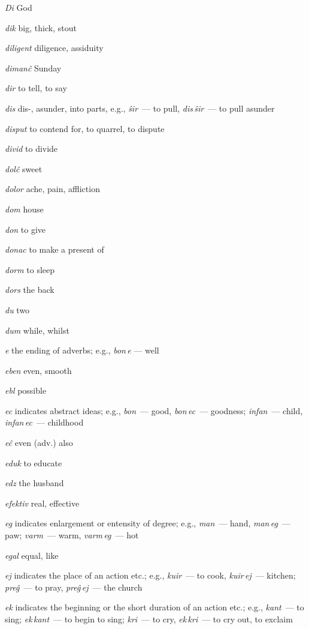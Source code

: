 \begin{landscape}
\begin{multicols}{5}
\begin{outdent}{1em}
\emph{Di}  God

\emph{dik}  big, thick, stout

\emph{diligent}  diligence, assiduity

\emph{dimanĉ}  Sunday

\emph{dir}  to tell, to say

\emph{dis}  dis-, asunder, into parts, e.g., \emph{ŝir\,} — to pull, \emph{dis\,ŝir\,} — to pull asunder

\emph{disput}  to contend for, to quarrel, to dispute

\emph{divid}  to divide

\emph{dolĉ}  sweet

\emph{dolor}  ache, pain, affliction

\emph{dom}  house

\emph{don}  to give

\emph{donac}  to make a present of

\emph{dorm}  to sleep

\emph{dors}  the back

\emph{du}  two

\emph{dum } while, whilst
\end{outdent}


\begin{outdent}{1em}
\emph{e  }the ending of adverbs; e.g., \emph{bon\,e} — well

\emph{eben}  even, smooth

\emph{ebl}  possible

\emph{ec}  indicates abstract ideas; e.g., \emph{bon\,} — good, \emph{bon\,ec\,} — goodness; \emph{infan\,} — child, \emph{infan\,ec\,} — childhood

\emph{eĉ}  even (adv.) also

\emph{eduk}  to educate

\emph{edz}  the husband

\emph{efektiv}  real, effective

\emph{eg } indicates enlargement or entensity of degree; e.g., \emph{man\,} — hand, \emph{man\,eg\,} — paw; \emph{varm\,} — warm, \emph{varm\,eg\,} — hot

\emph{egal}  equal, like

\emph{ej}  indicates the place of an action etc.; e.g., \emph{kuir\,} — to cook, \emph{kuir\,ej\,} — kitchen; \emph{preĝ\,} — to pray, \emph{preĝ\,ej\,} — the church

\emph{ek}  indicates the beginning or the short duration of an action etc.; e.g., \emph{kant\,} — to sing; \emph{ek\,kant\,} — to begin to sing; \emph{kri\,} — to cry, \emph{ek\,kri\,} — to cry out, to exclaim


\end{outdent}
\end{multicols}
\end{landscape}
